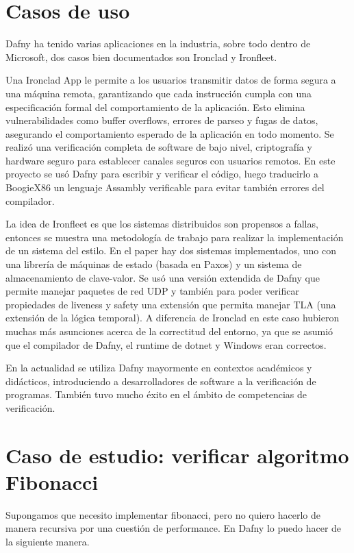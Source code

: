 \documentclass[runningheads]{llncs}
\begin{document}
\section{Casos de uso}

Dafny ha tenido varias aplicaciones en la industria, sobre todo dentro de Microsoft, dos casos bien documentados son Ironclad y Ironfleet.

Una Ironclad\cite{hawblitzel2014ironclad} App le permite a los usuarios transmitir datos de forma segura a una máquina remota, garantizando que cada instrucción cumpla con una especificación 
formal del comportamiento de la aplicación. Esto elimina vulnerabilidades como buffer overflows, errores de parseo y fugas de datos, asegurando el comportamiento esperado de la aplicación en todo momento.
Se realizó una verificación completa de software de bajo nivel, criptografía y hardware seguro para establecer canales seguros con usuarios remotos.
En este proyecto se usó Dafny para escribir y verificar el código, luego traducirlo a BoogieX86 un lenguaje Assambly verificable para evitar también errores del compilador.

La idea de Ironfleet\cite{hawblitzel2015ironfleet} es que los sistemas distribuidos son propensos a fallas, entonces se muestra una metodología de trabajo para realizar la implementación de un 
sistema del estilo. En el paper hay dos sistemas implementados, uno con una librería de máquinas de estado (basada en Paxos) y un sistema de almacenamiento de clave-valor.
Se usó una versión extendida de Dafny que permite manejar paquetes de red UDP y también para poder verificar propiedades de liveness y safety una extensión que permita manejar TLA 
(una extensión de la lógica temporal).
A diferencia de Ironclad en este caso hubieron muchas más asunciones acerca de la correctitud del entorno, ya que se asumió que el compilador de Dafny, el runtime de dotnet y Windows eran correctos.

En la actualidad se utiliza Dafny mayormente en contextos académicos y didácticos, introduciendo a desarrolladores de software a la verificación de programas.
También tuvo mucho éxito en el ámbito de competencias de verificación.


\section{Caso de estudio: verificar algoritmo Fibonacci}
Supongamos que necesito implementar fibonacci, pero no quiero hacerlo de manera recursiva por una cuestión de performance. En Dafny lo puedo hacer de la siguiente manera.
\end{document}
